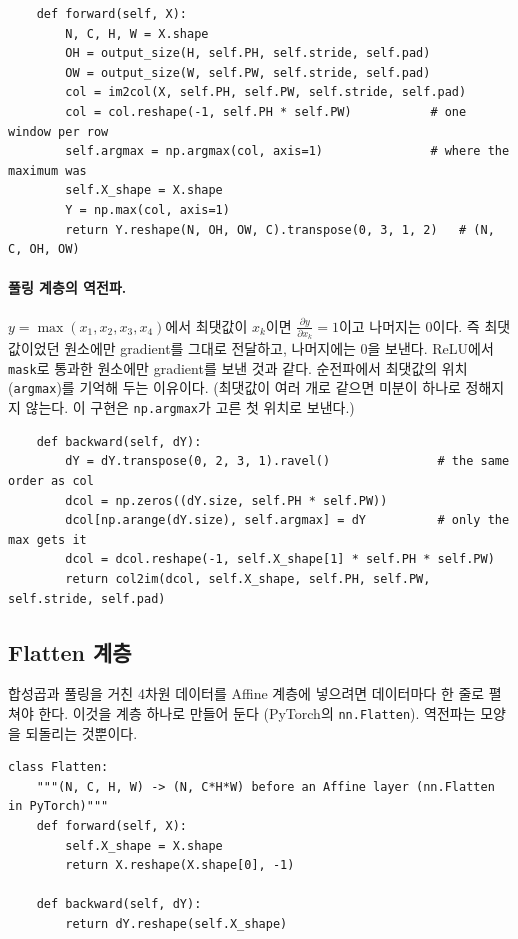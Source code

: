 \documentclass[11pt,a4paper]{article}
\newcommand{\pd}[2]{\frac{\partial #1}{\partial #2}}
\begin{document}
\begin{lstlisting}
    def forward(self, X):
        N, C, H, W = X.shape
        OH = output_size(H, self.PH, self.stride, self.pad)
        OW = output_size(W, self.PW, self.stride, self.pad)
        col = im2col(X, self.PH, self.PW, self.stride, self.pad)
        col = col.reshape(-1, self.PH * self.PW)           # one window per row
        self.argmax = np.argmax(col, axis=1)               # where the maximum was
        self.X_shape = X.shape
        Y = np.max(col, axis=1)
        return Y.reshape(N, OH, OW, C).transpose(0, 3, 1, 2)   # (N, C, OH, OW)
\end{lstlisting}

\paragraph{풀링 계층의 역전파.}
$y=\max(x_1,x_2,x_3,x_4)$에서 최댓값이 $x_k$이면 $\pd{y}{x_k}=1$이고 나머지는 $0$이다.
즉 최댓값이었던 원소에만 gradient를 그대로 전달하고, 나머지에는 $0$을 보낸다.
ReLU에서 \texttt{mask}로 통과한 원소에만 gradient를 보낸 것과 같다.
순전파에서 최댓값의 위치(\texttt{argmax})를 기억해 두는 이유이다.
(최댓값이 여러 개로 같으면 미분이 하나로 정해지지 않는다. 이 구현은 \texttt{np.argmax}가 고른 첫 위치로 보낸다.)
\begin{lstlisting}
    def backward(self, dY):
        dY = dY.transpose(0, 2, 3, 1).ravel()               # the same order as col
        dcol = np.zeros((dY.size, self.PH * self.PW))
        dcol[np.arange(dY.size), self.argmax] = dY          # only the max gets it
        dcol = dcol.reshape(-1, self.X_shape[1] * self.PH * self.PW)
        return col2im(dcol, self.X_shape, self.PH, self.PW, self.stride, self.pad)
\end{lstlisting}

\subsection{Flatten 계층}\label{sec:flatten}

합성곱과 풀링을 거친 4차원 데이터를 Affine 계층에 넣으려면 데이터마다 한 줄로 펼쳐야 한다.
이것을 계층 하나로 만들어 둔다 (PyTorch의 \texttt{nn.Flatten}). 역전파는 모양을 되돌리는 것뿐이다.
\begin{lstlisting}
class Flatten:
    """(N, C, H, W) -> (N, C*H*W) before an Affine layer (nn.Flatten in PyTorch)"""
    def forward(self, X):
        self.X_shape = X.shape
        return X.reshape(X.shape[0], -1)

    def backward(self, dY):
        return dY.reshape(self.X_shape)
\end{lstlisting}
\end{document}
